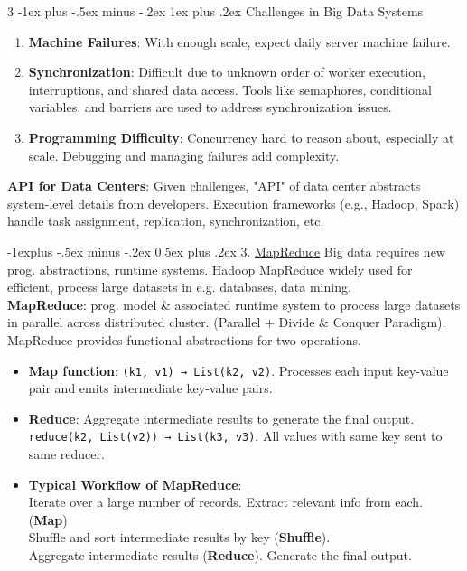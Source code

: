 \documentclass[a4paper, 9pt, landscape]{article}
\makeatletter
\renewcommand{\subsection}{\@startsection{subsection}{2}{0mm}%
                                {-1explus -.5ex minus -.2ex}%
                                {0.5ex plus .2ex}%
                                {\normalfont\normalsize\bfseries}}
\renewcommand{\subsubsection}{\@startsection{subsubsection}{3}{0mm}%
                                {-1ex plus -.5ex minus -.2ex}%
                                {1ex plus .2ex}%
                                {\normalfont\small\bfseries}}
\makeatother
\begin{document}
\begin{multicols*}{3}
\subsubsection{Challenges in Big Data Systems}
\begin{enumerate}
    \item \textbf{Machine Failures}: With enough scale, expect daily server machine failure.
    \item \textbf{Synchronization}: Difficult due to unknown order of worker execution, interruptions, and shared data access. Tools like semaphores, conditional variables, and barriers are used to address synchronization issues.
    \item \textbf{Programming Difficulty}: Concurrency hard to reason about, especially at scale. Debugging and managing failures add complexity.
\end{enumerate}
\textbf{API for Data Centers}: Given challenges, "API" of data center abstracts system-level details from developers. Execution frameworks (e.g., Hadoop, Spark) handle task assignment, replication, synchronization, etc.


\subsection{3. \underline{MapReduce}}
Big data requires new prog. abstractions, runtime systems. Hadoop MapReduce widely used for efficient, process large datasets in e.g. databases, data mining. \\
\textbf{MapReduce}: prog. model \& associated runtime system to process large datasets in parallel across distributed cluster. (Parallel $+$ Divide \& Conquer Paradigm). MapReduce provides functional abstractions for two operations.

\begin{itemize}
    \item \textbf{Map function}:  \texttt{(k1, v1) → List(k2, v2)}. Processes each input key-value pair and emits intermediate key-value pairs. 
    \item \textbf{Reduce}: Aggregate intermediate results to generate the final output.  \texttt{reduce(k2, List(v2)) → List(k3, v3)}. All values with same key sent to same reducer.
	\item \textbf{Typical Workflow of MapReduce}: \\
	Iterate over a large number of records. Extract relevant info from each. (\textbf{Map}) \\
	Shuffle and sort intermediate results by key (\textbf{Shuffle}). \\
	Aggregate intermediate results (\textbf{Reduce}). Generate the final output.
\end{itemize}


\end{multicols*}
\end{document}
